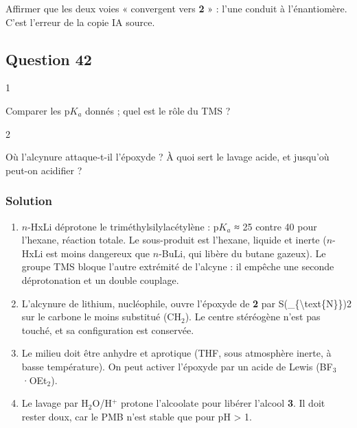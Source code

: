 \documentclass[11pt,a4paper]{article}
\providecommand{\tightlist}{\setlength{\itemsep}{0pt}\setlength{\parskip}{0pt}}
\begin{document}
\begin{piege}

Affirmer que les deux voies « convergent vers \textbf{2} » : l'une conduit à l'énantiomère. C'est l'erreur de la copie IA source.

\end{piege}

\hypertarget{question-42}{%
\subsection{Question 42}\label{question-42}}

\begin{indication}{1}

Comparer les p\(K_a\) donnés ; quel est le rôle du TMS ?

\end{indication}

\begin{indication}{2}

Où l'alcynure attaque-t-il l'époxyde ? À quoi sert le lavage acide, et jusqu'où peut-on acidifier ?

\end{indication}

\hypertarget{solution-41}{%
\subsubsection{Solution}\label{solution-41}}

\begin{enumerate}
\def\labelenumi{\arabic{enumi}.}
\tightlist
\item
  \(n\)-HxLi déprotone le triméthylsilylacétylène : p\(K_a\) ≈ 25 contre 40 pour l'hexane, réaction totale. Le sous-produit est l'hexane, liquide et inerte (\(n\)-HxLi est moins dangereux que \(n\)-BuLi, qui libère du butane gazeux). Le groupe TMS bloque l'autre extrémité de l'alcyne : il empêche une seconde déprotonation et un double couplage.
\item
  L'alcynure de lithium, nucléophile, ouvre l'époxyde de \textbf{2} par S(\_\{\textbackslash text\{N\}\})2 sur le carbone le moins substitué (\(\mathrm{CH_2}\)). Le centre stéréogène n'est pas touché, et sa configuration est conservée.
\item
  Le milieu doit être anhydre et aprotique (THF, sous atmosphère inerte, à basse température). On peut activer l'époxyde par un acide de Lewis (BF\(_3\)·OEt\(_2\)).
\item
  Le lavage par \(\mathrm{H_2O}\)/H\(^+\) protone l'alcoolate pour libérer l'alcool \textbf{3}. Il doit rester doux, car le PMB n'est stable que pour pH \textgreater{} 1.
\end{enumerate}
\end{document}
